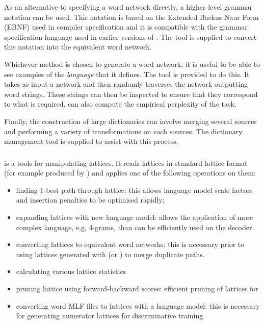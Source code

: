 As an alternative to specifying a word network directly, a higher
level grammar notation can be used.  This notation is based on
the Extended Backus Naur Form (EBNF) used in compiler specification and
it is compatible with the grammar specification language used in 
earlier versions of \HTK.  The 
tool  is supplied
to convert this notation into the equivalent word network.

Whichever method is chosen to generate a word network, it is useful
to be able to see examples of the \textit{language} that it defines.
The tool  is 
provided to do this.  It takes as input
a network and then randomly traverses the network outputting word
strings.  These strings can then be inspected to ensure that they
correspond to what is required.   can also compute
the empirical perplexity of the task.

Finally, the construction of large dictionaries can involve merging
several sources and performing a variety of transformations on each
sources.  The dictionary management 
tool  is supplied
to assist with this process.

\subsubsection{}
 is a tools for manipulating lattices. It reads
lattices in standard lattice format (for example produced by
) and applies one of the following operations on them:

\begin{itemize}
\item finding 1-best path through lattice: this allows language
model scale factors and insertion penalties to be optimised rapidly;
\item expanding lattices with new language model: allows the application
of more complex language, e,g, 4-grams, than can be efficiently used
on the decoder.
\item converting lattices to equivalent word networks: this is necessary
prior to using lattices generated with  (or )
to merge duplicate paths.
\item calculating various lattice statistics
\item pruning lattice using forward-backward scores: efficient pruning
of lattices for 
\item converting word MLF files to lattices with a language model: this
is necessary for generating numerator lattices for discriminative training.
\end{itemize}

